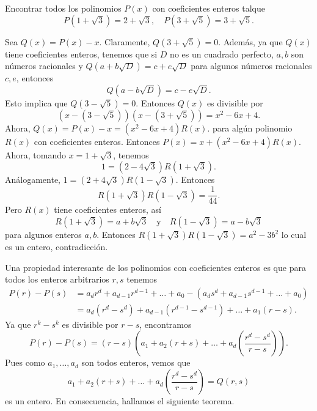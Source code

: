 \begin{example}
    Encontrar todos los polinomios $P(x)$ con coeficientes enteros talque
    \[
        P(1 + \sqrt {3}) = 2 + \sqrt {3}, \quad P(3 + \sqrt {5}) = 3 + \sqrt {5}.
    \]
\end{example}
\begin{solution}
    Sea $Q(x) = P(x) - x$.
    Claramente, $Q(3 +  \sqrt {5}) = 0$.
    Además, ya que $Q(x)$ tiene coeficientes enteros, tenemos que si $D$ no es un cuadrado perfecto,
    $a, b$ son números racionales y $Q(a + b\sqrt {D}) = c + e\sqrt {D}$ para algunos números racionales $c, e$, entonces
    \[
        Q(a - b \sqrt {D}) = c - e \sqrt {D}.
    \]
    Esto implica que $Q(3 - \sqrt {5}) = 0$.
    Entonces $Q(x)$ es divisible por
    \[
        \left(x - (3 - \sqrt {5})\right) \left(x - (3 + \sqrt {5})\right) = x^2 - 6x + 4.
    \]
    Ahora, $Q(x) = P(x) - x = (x^2 - 6x + 4) R(x).$
    para algún polinomio $R(x)$ con coeficientes enteros.
    Entonces $P(x) = x + (x^2 - 6x + 4) R(x).$
    Ahora, tomando $x = 1 + \sqrt {3}$, tenemos
    \[
        1 = \left(2 - 4\sqrt {3}\right) R\left(1 + \sqrt {3}\right).
    \]
    Análogamente, $1 = \left(2 + 4\sqrt {3}\right)  R\left(1 - \sqrt {3}\right)$.
    Entonces
    \[
        R\left(1 + \sqrt {3}\right)  R\left(1 - \sqrt {3}\right) = \frac{1}{44}.
    \]
    Pero $R(x)$ tiene coeficientes enteros, así
    \[
        R\left(1 + \sqrt {3}\right) = a + b\sqrt {3} \quad \text{y} \quad R\left(1 - \sqrt {3}\right) = a - b\sqrt {3}
    \]
    para algunos enteros $a,b$.
    Entonces $R\left(1 + \sqrt {3}\right) R\left(1 - \sqrt {3}\right) = a^2 - 3b^2$ lo cual es un entero, contradicción.
\end{solution}

Una propiedad interesante de los polinomios con coeficientes enteros es que para todos los enteros arbitrarios $r,s$ tenemos
\begin{align*}
    P(r) - P(s) &= a_d r^d + a_{d - 1} r^{d - 1} + \ldots + a_0 - \left(a_d s^d + a_{d - 1} s^{d - 1} + \ldots + a_0\right)\\
    & = a_d (r^d - s^d) + a_{d - 1} (r^{d - 1} - s^{d - 1}) + \ldots + a_1 (r - s).
\end{align*}
Ya que $r^k - s^k$ es divisible por $r - s$, encontramos
\[
    P(r) - P(s) = (r - s) \left(a_1 + a_2 (r + s) + \ldots + a_d \left(\frac{r^d - s^d}{r - s}\right)\right).
\]
Pues como $a_1, \ldots, a_d$ son todos enteros, vemos que
\[
    a_1 + a_2 (r + s) + \ldots + a_d \left(\frac{r^d - s^d}{r - s}\right) = Q(r, s)
\]
es un entero.
En consecuencia, hallamos el siguiente teorema.

